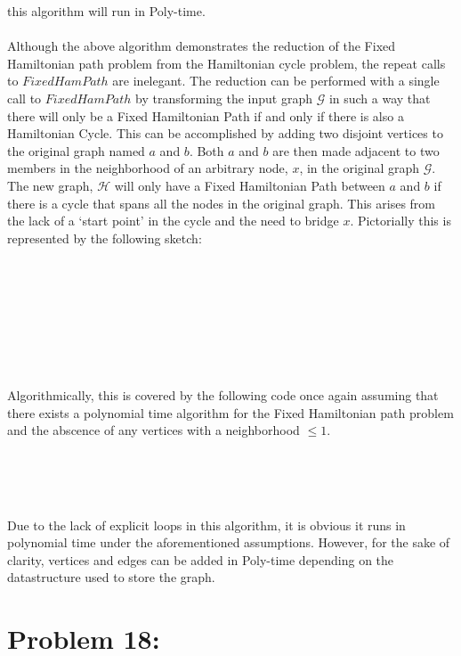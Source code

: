 \documentclass[12pt]{article}
\begin{document}
this algorithm will run in Poly-time.\\\\
Although the above algorithm demonstrates the reduction of the
Fixed Hamiltonian path problem from the Hamiltonian cycle problem, the
repeat calls to $FixedHamPath$ are inelegant. The reduction can be 
performed with a single call to $FixedHamPath$ by transforming the
input graph $\mathcal{G}$ in such a way that there will only be a
Fixed Hamiltonian Path if and only if there is also a Hamiltonian 
Cycle.  This can be accomplished by adding two disjoint vertices
to the original graph named $a$ and $b$.  Both $a$ and $b$ are then
made adjacent to two members in the neighborhood of an arbitrary node, $x$,
in the original graph $\mathcal{G}$.  The new graph, $\mathcal{H}$
will only have a Fixed Hamiltonian Path between $a$ and $b$
if there is a cycle that spans all the nodes in
the original graph.  This arises from the lack of a `start point' in
the cycle and the need to bridge $x$.
Pictorially this is represented by the following
sketch:\\\\\\\\\\\\\\\\\\   

Algorithmically, this is covered by the following code once again
assuming that there exists a polynomial time algorithm for the
Fixed Hamiltonian path problem and the abscence of any vertices with
a neighborhood $\leq 1$.\\\\ 
\begin{algorithm}[H]
\\
\\
\end{algorithm}
Due to the lack of explicit loops in this algorithm, it is obvious it
runs in polynomial time under the aforementioned assumptions.  However,
for the sake of clarity, vertices and edges can be added in Poly-time
depending on the datastructure used to store the graph.
\section*{Problem 18: }
\end{document}
